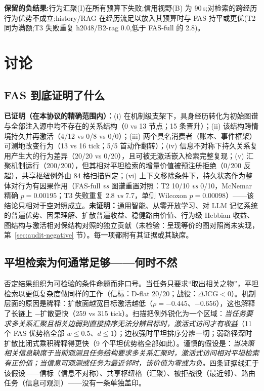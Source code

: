 \documentclass[10pt,a4paper]{ctexart}
\begin{document}
\textbf{保留的负结果:}行为汇聚(I)在所有预算下失败;信用视野(B)
为 90\,s;对检索的跨经历行为优势不成立;history/RAG 在经历流足以放入其预算时与 FAS 持平或更优(T2 同为满额;T3 失败重复 h2048/B2-rag 0.0,低于 FAS-full 的 2.8)。

\section{讨论}
\label{sec:discussion}

\subsection{FAS 到底证明了什么}
\textbf{已证明（在本协议的精确范围内）：}(i) 在机制级支架下，具身经历转化为初始图谱与全部注入源中均不存在的关系结构（0 vs 13 节点；15 条晋升）；(ii) 该结构跨情境持久并再激活（4/12 vs 0/8 vs 0/0）；(iii) 两个具名消费者（账本、事件框架）可测地改变行为（13 vs 16 tick；5/5 首动作翻转）；(iv) 信息不对称下持久关系复用产生大的行为差异（20/20 vs 0/20），且可被无激活嵌入检索完整复现；(v) 汇聚机制运行（200/200），但其相对平坦检索的增量价值被预注册拒绝（0/200 反超），共享枢纽例外由 84 格扫描界定；(vi) 上下文移除条件下，持久状态作为整体对行为有因果作用（FAS-full \emph{vs} 图谱重置对照：T2 10/10 \emph{vs} 0/10，McNemar 精确 $p{=}0.00195$；T3 失败重复 2.8 \emph{vs} 7.7，单侧 Wilcoxon $p{=}0.00098$）——该结论只相对于空对照成立。\textbf{未证明：}通用智能、从零开放学习、对 LLM 记忆系统的普遍优势、因果理解、扩散普遍收益、稳健路由价值、行为级 Hebbian 收益、图结构与激活相对保结构对照的独立贡献（未检验：呈现等价的图对照尚未实现，第~\ref{sec:audit-negative} 节）。每一项都附有其证据或其缺席。

\subsection{平坦检索为何通常足够——何时不然}
否定结果组织为可检验的条件命题而非口号。当任务只要求“取出相关之物”，平坦检索以更低复杂度做同样的工作（信标：D-flat 20/20；战役：$\Delta$JCG${<}0$）。机制层面的原因是稀释：扩散面越宽目标激活越低（$\rho{=}{-}0.445$、${-}0.656$），这也解释了长链上 $-$扩散更快（259 vs 315 tick）。扫描把例外锐化为一个区域：\emph{当任务要求多关系汇聚且相关边弱到直接排序无法分辨目标时，激活式访问才有收益}（11 个 FAS 优势格全部 $w{\le}0.5$、$d{\le}1$）；边权强时平坦排序分辨一切；弱路径深时扩散比闭式乘积稀释得更快（9 个平坦优势格全部如此）。谨慎的假设是：\emph{当决策相关信息缺席于当前观测且任务结构要求多关系汇聚时，激活式访问相对平坦检索有正价值；当信息可观测或任务为最近邻时，该价值为零或为负。}四条证据线汇于该假设——信标（信息不对称）、共享枢纽格（汇聚）、被拒战役（最近邻）、路由任务（信息可观测）——没有一条单独盖印。
\end{document}
